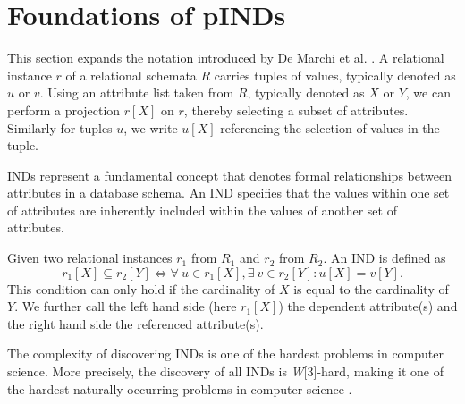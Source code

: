 \section{Foundations of pINDs}\label{sec:foundations}
This section expands the notation introduced by De Marchi et al. \cite{marchi2009unary}. A relational instance $r$ of a relational schemata $R$ carries tuples of values, typically denoted as $u$ or $v$. Using an attribute list taken from $R$, typically denoted as $X$ or $Y$, we can perform a projection $r[X]$ on $r$, thereby selecting a subset of attributes. Similarly for tuples $u$, we write $u[X]$ referencing the selection of values in the tuple.

INDs represent a fundamental concept that denotes formal relationships between attributes in a database schema. An IND specifies that the values within one set of attributes are inherently included within the values of another set of attributes.
\begin{definition}\label{def:inds}
    Given two relational instances $r_1$ from $R_1$ and $r_2$ from $R_2$. An IND is defined as $$r_1[X] \subseteq r_2[Y] \iff \forall \: u \in r_1[X], \exists \: v \in r_2[Y] : u[X] = v[Y].$$ This condition can only hold if the cardinality of $X$ is equal to the cardinality of $Y$. We further call the left hand side (here $r_1[X]$) the dependent attribute(s) and the right hand side the referenced attribute(s).
\end{definition}
The complexity of discovering INDs is one of the hardest problems in computer science. More precisely, the discovery of all INDs is \textit{W}[3]-hard, making it one of the hardest naturally occurring problems in computer science \cite{blasius2017parameterized}. 


